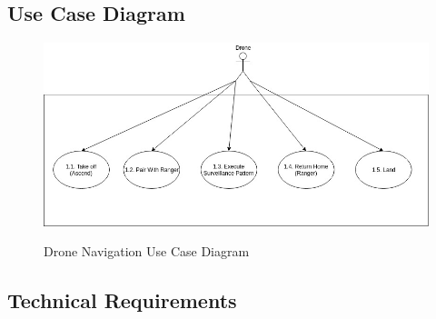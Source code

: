 \subsection{Use Case Diagram}
\begin{center}
	\begin{flushleft}
		\begin{figure}[h!]
			\centering
			\includegraphics[scale=0.5]{./assets/images/navigation-ucd.jpg}
			\label{fig: object-recognition-ucd }
			\caption{Drone Navigation Use Case Diagram}
		\end{figure}

	\end{flushleft}
\end{center}

\subsection{Technical Requirements}
	\begin{flushleft}
	\end{flushleft}
